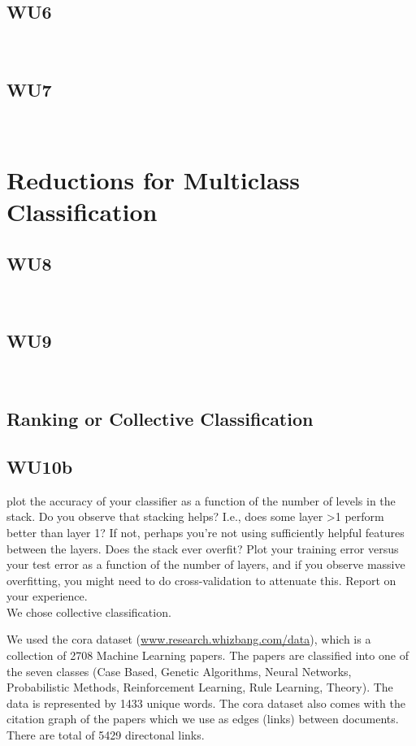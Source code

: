 \documentclass[a4paper,11pt]{article}
\begin{document}
\subsection{WU6}
\textsf{}\\

\subsection{WU7}
\textsf{}\\

\section{Reductions for Multiclass Classification}
\subsection{WU8}
\textsf{}\\

\subsection{WU9}
\textsf{}\\
\pagebreak
\subsection{Ranking or Collective Classification}
\subsection{WU10b}
\textsf{plot the accuracy of your classifier as a function
  of the number of levels in the stack. Do you observe that stacking
  helps? I.e., does some layer >1 perform better than layer 1? If not,
  perhaps you're not using sufficiently helpful features between the
  layers. Does the stack ever overfit? Plot your training error versus
  your test error as a function of the number of layers, and if you
  observe massive overfitting, you might need to do cross-validation
  to attenuate this. Report on your experience.}\\
We chose collective classification. 

We used the cora dataset (\url{www.research.whizbang.com/data}), which is a collection of
2708 Machine Learning papers. The papers are classified into one of the seven
classes (Case Based, Genetic Algorithms, Neural Networks,
Probabilistic Methods, Reinforcement Learning, Rule Learning,
Theory). The data is represented by 1433 unique words.
The cora dataset also comes with the citation graph of the papers
which we use as edges (links) between documents. There are total of
5429 directonal links.
\end{document}
